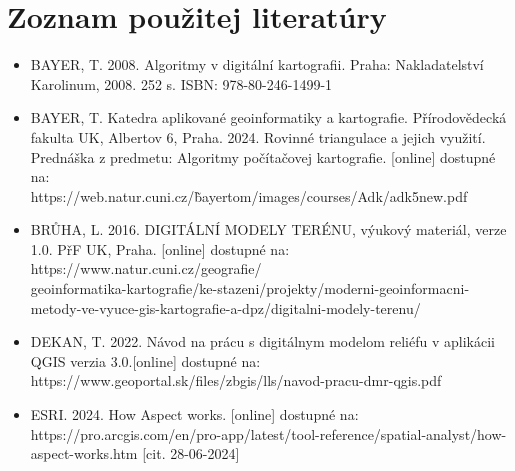 \documentclass[12pt]{article}
\begin{document}
\section*{Zoznam použitej literatúry}
\begin{itemize}
       
    \item BAYER, T. 2008. Algoritmy v digitální kartografii. Praha: Nakladatelství Karolinum, 2008. 252 s. ISBN: 978-80-246-1499-1
    \item BAYER, T. Katedra aplikované geoinformatiky a kartografie. Přírodovědecká fakulta UK, Albertov 6, Praha. 2024. Rovinné triangulace a jejich využití. Prednáška z predmetu: Algoritmy počítačovej kartografie. [online] dostupné na: \\https://web.natur.cuni.cz/\~bayertom/images/courses/Adk/adk5\textunderscore new.pdf 
    \item BRŮHA, L. 2016. DIGITÁLNÍ MODELY TERÉNU, výukový materiál, verze 1.0. PřF UK, Praha. [online] dostupné na: https://www.natur.cuni.cz/geografie/\\geoinformatika-kartografie/ke-stazeni/projekty/moderni-geoinformacni-metody-ve-vyuce-gis-kartografie-a-dpz/digitalni-modely-terenu/
    \item DEKAN, T. 2022. Návod na prácu s digitálnym modelom reliéfu v aplikácii QGIS
    verzia 3.0.[online] dostupné na: https://www.geoportal.sk/files/zbgis/lls/navod-pracu-dmr-qgis.pdf
   \item ESRI. 2024. How Aspect works. [online] dostupné na: https://pro.arcgis.com/en/pro-app/latest/tool-reference/spatial-analyst/how-aspect-works.htm [cit. 28-06-2024] 
   

\end{itemize}
\end{document}
